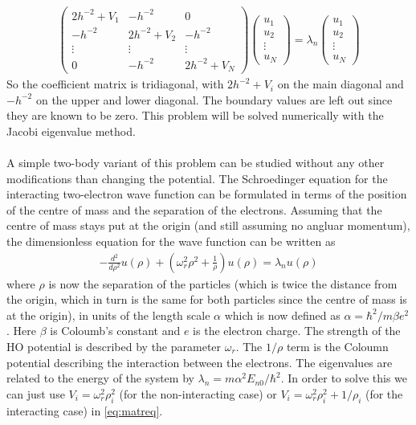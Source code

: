 \documentclass{article}
\newcommand{\lrp}[1]{\left(#1\right)}
\begin{document}
\begin{align} \label{eq:matreq}
	\lrp{\begin{array}{ccc}
		2h^{-2} + V_1 & -h^{-2} & 0 \\
		-h^{-2} & 2h^{-2} + V_2 & -h^{-2} \\
		\vdots & \vdots & \vdots \\
		0 & -h^{-2} & 2h^{-2} + V_N
	\end{array}}
	\lrp{\begin{array}{c}
	u_1 \\
	u_2 \\
	\vdots \\
	u_N
	\end{array}} = \lambda_n
	\lrp{\begin{array}{c}
	u_1 \\
	u_2 \\
	\vdots \\
	u_N
	\end{array}}
\end{align}
So the coefficient matrix is tridiagonal, with $2h^{-2} + V_i$ on the main diagonal and $-h^{-2}$ on the upper and lower diagonal. The boundary values are left out since they are known to be zero. This problem will be solved numerically with the Jacobi eigenvalue method.\\\\
A simple two-body variant of this problem can be studied without any other modifications than changing the potential. The Schroedinger equation for the interacting two-electron wave function can be formulated in terms of the position of the centre of mass and the separation of the electrons. Assuming that the centre of mass stays put at the origin (and still assuming no angluar momentum), the dimensionless equation for the wave function can be written as
\begin{align*}
	-\frac{d^2}{d\rho^2}u(\rho) + \lrp{\omega_r^2\rho^2 + \frac{1}{\rho}}u(\rho) = \lambda_n u(\rho)
\end{align*}
where $\rho$ is now the separation of the particles (which is twice the distance from the origin, which in turn is the same for both particles since the centre of mass is at the origin), in units of the length scale $\alpha$ which is now defined as $\alpha = \hbar^2/m\beta e^2$. Here $\beta$ is Coloumb's constant and $e$ is the electron charge. The strength of the HO potential is described by the parameter $\omega_r$. The $1/\rho$ term is the Coloumn potential describing the interaction between the electrons. The eigenvalues are related to the energy of the system by $\lambda_n = m\alpha^2E_{n0}/\hbar^2$. In order to solve this we can just use $V_i = \omega_r^2\rho_i^2$ (for the non-interacting case) or $V_i = \omega_r^2\rho_i^2 + 1/\rho_i$ (for the interacting case) in \eqref{eq:matreq}.
\end{document}
